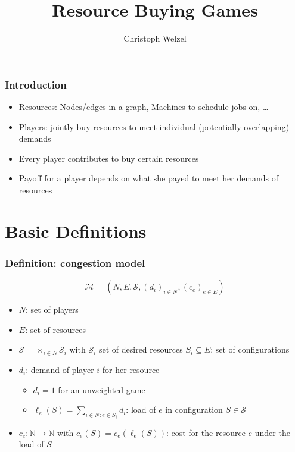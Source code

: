 \documentclass{beamer}
\title{Resource Buying Games}
\author[C. Welzel]{Christoph Welzel}
\newcommand{\tupel}[1]{\left(#1\right)}
\begin{document}

\maketitle

\begin{frame}
  \frametitle{Introduction}
    \begin{itemize}
      \item Resources: Nodes/edges in a graph, Machines to schedule jobs on,
        \dots
      \item Players: jointly buy resources to meet individual
        (potentially overlapping) demands
      \item<2-> Every player contributes to buy certain resources
      \item<3-> Payoff for a player depends on what she payed to meet her demands
        of resources
    \end{itemize}
\end{frame}

\section{Basic Definitions}
\begin{frame}
  \frametitle{Definition: congestion model}
  \begin{equation*}
    \mathcal{M} = \tupel{N, E, \mathcal{S}, \left(d_{i}\right)_{i\in N},
    \left(c_{e}\right)_{e\in E}}
  \end{equation*}
  \vspace{-1cm}
  \begin{itemize}
    \item $N$: set of players
    \item<2-> $E$: set of resources
    \item<3-> $\mathcal{S} = \times_{i\in N}\mathcal{S}_{i}$ with $\mathcal{S}_{i}$
      set of desired resources $S_{i}\subseteq E$: set of configurations
    \item<4-> $d_{i}$: demand of player $i$ for her resource
      \begin{itemize}
        \item<4-> $d_{i} = 1$ for an unweighted game
        \item<4-> $\ell_{e}(S) = \sum_{i\in N:e\in S_{i}}d_{i}$: load of $e$
          in configuration $S\in\mathcal{S}$
      \end{itemize}
    \item<5-> $c_{e}:\mathbb{N}\rightarrow\mathbb{N}$ with
      $c_{e}(S) = c_{e}(\ell_{e}(S))$: cost for the resource $e$ under the load
      of $S$
  \end{itemize}
\end{frame}
\end{document}
